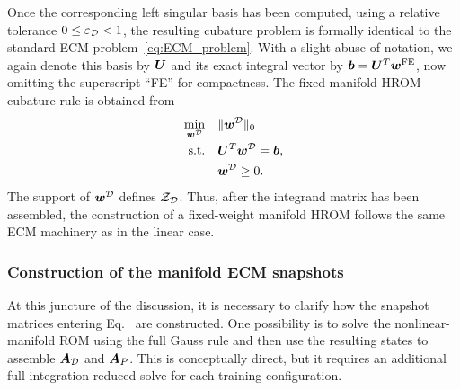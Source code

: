 \documentclass[11pt,a4paper]{article}
\begin{document}
Once the corresponding left singular basis has been computed, using a
relative tolerance \(0\le\varepsilon_{\mathcal{D}}<1\), the resulting cubature problem
is formally identical to the standard ECM problem~\eqref{eq:ECM_problem}.  With a slight abuse
of notation, we again denote this basis by $\bm{U}$ and its exact integral vector
by $\bm{b}= \bm{U}^T\bm{w}^{\mathrm{FE}}$, now omitting the superscript ``FE'' for compactness. The fixed
manifold-HROM cubature rule is obtained from
\begin{equation}
\label{eq:ECM_problem_manifold_fixed}
\begin{aligned}
    \min_{\bm{w}^{\mathcal{D}}} \quad & \|\bm{w}^{\mathcal{D}}\|_0 \\
    \text{s.t.} \quad & \bm{U}^T \bm{w}^{\mathcal{D}} = \bm{b}, \\
                      & \bm{w}^{\mathcal{D}} \ge 0 .
\end{aligned}
\end{equation}
The support of $\bm{w}^{\mathcal{D}}$ defines $\mathcal{Z}_{\mathcal{D}}$. Thus, after the integrand matrix has been
assembled, the construction of a fixed-weight manifold HROM follows the same
ECM machinery as in the linear case.

\subsubsection{Construction of the manifold ECM snapshots}
\label{subsubsec:manifold_ECM_snapshots}

At this juncture of the discussion, it is necessary to clarify how the snapshot matrices entering
Eq.~ are constructed. One possibility is to solve the nonlinear-manifold ROM using the full Gauss
rule and then use the resulting states to assemble $\bm{A}_{\mathcal{D}}$ and $\bm{A}_{P}$. This
is conceptually direct, but it requires an additional full-integration reduced
solve for each training configuration.
\end{document}
